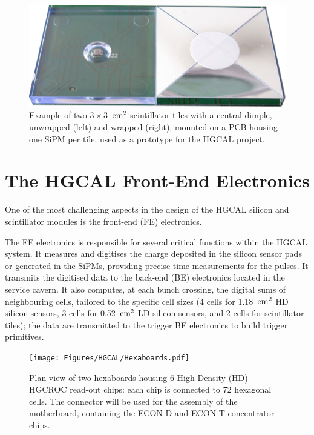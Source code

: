 \begin{figure}
    \centering
    \includegraphics[width=0.5\linewidth]{Figures/HGCAL/ScintillatorTiles.pdf}
    \caption{Example of two $3\times3$~$\textnormal{cm}^2$ scintillator tiles with a central dimple, unwrapped (left) and wrapped (right), mounted on a PCB housing one SiPM per tile, used as a prototype for the HGCAL project.}
    \label{fig:ScintillatorTiles}
\end{figure}


\section{The HGCAL Front-End Electronics}
\label{sec:The HGCAL Front-End Electronics}

One of the most challenging aspects in the design of the HGCAL silicon and scintillator modules is the front-end (FE) electronics. 

The FE electronics is responsible for several critical functions within the HGCAL system. It measures and digitises the charge deposited in the silicon sensor pads or generated in the SiPMs, providing precise time measurements for the pulses. It transmits the digitised data to the back-end (BE) electronics located in the service cavern. It also computes, at each bunch crossing, the digital sums of neighbouring cells, tailored to the specific cell sizes (4 cells for 1.18~$\textnormal{cm}^2$ HD silicon sensors, 3 cells for 0.52~$\textnormal{cm}^2$ LD silicon sensors, and 2 cells for scintillator tiles); the data are transmitted to the trigger BE electronics to build trigger primitives.

\begin{figure}
    \centering
    \texttt{[image: Figures/HGCAL/Hexaboards.pdf]}
    \caption{Plan view of two hexaboards housing 6 High Density (HD) HGCROC read-out chips: each chip is connected to 72 hexagonal cells. The connector will be used for the assembly of the motherboard, containing the ECON-D and ECON-T concentrator chips.}
    \label{fig:Hexaboards}
\end{figure}

